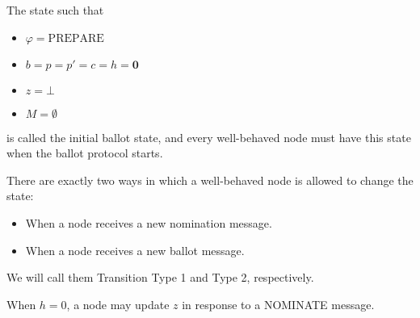 \begin{defn}\label{Initial Ballot State}
    The state such that
    \begin{itemize}
        \item
            $\varphi = \text{PREPARE}$
        \item
            $b = p = p' = c = h = \textbf{0}$
        \item
            $z = \bot$
        \item
            $M = \emptyset$
    \end{itemize}
    is called the initial ballot state, and every well-behaved node must have this state when the ballot protocol starts.
\end{defn}

There are exactly two ways in which a well-behaved node is allowed to change the state:
\begin{itemize}
    \item
        When a node receives a new nomination message.
    \item
        When a node receives a new ballot message.
\end{itemize}

We will call them Transition Type 1 and Type 2, respectively.

\begin{defn}
    When $h = 0$, a node may update $z$ in response to a NOMINATE message.
\end{defn}

